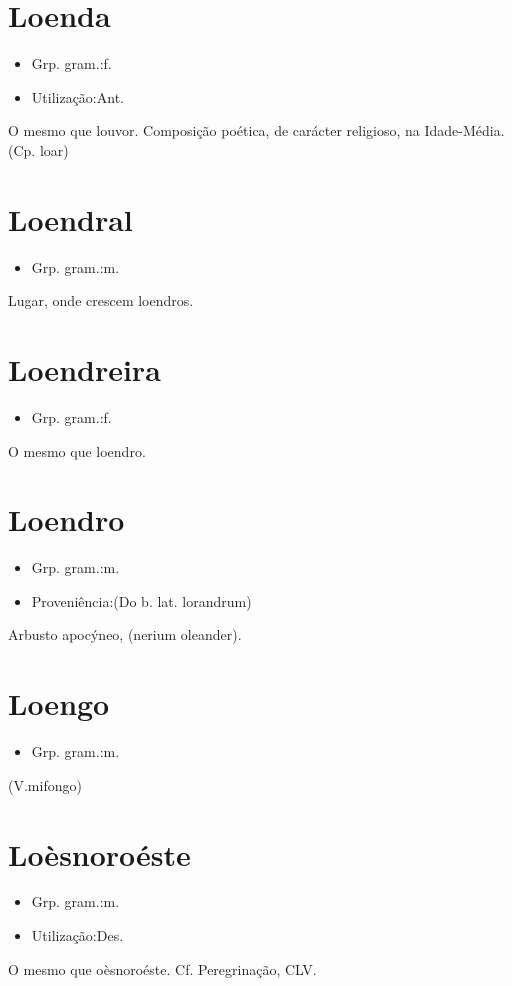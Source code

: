 \section{Loenda}
\begin{itemize}
\item {Grp. gram.:f.}
\end{itemize}
\begin{itemize}
\item {Utilização:Ant.}
\end{itemize}
O mesmo que \textunderscore louvor\textunderscore .
Composição poética, de carácter religioso, na Idade-Média.
(Cp. \textunderscore loar\textunderscore )
\section{Loendral}
\begin{itemize}
\item {Grp. gram.:m.}
\end{itemize}
Lugar, onde crescem loendros.
\section{Loendreira}
\begin{itemize}
\item {Grp. gram.:f.}
\end{itemize}
O mesmo que \textunderscore loendro\textunderscore .
\section{Loendro}
\begin{itemize}
\item {Grp. gram.:m.}
\end{itemize}
\begin{itemize}
\item {Proveniência:(Do b. lat. \textunderscore lorandrum\textunderscore )}
\end{itemize}
Arbusto apocýneo, (\textunderscore nerium oleander\textunderscore ).
\section{Loengo}
\begin{itemize}
\item {Grp. gram.:m.}
\end{itemize}
(V.mifongo)
\section{Loèsnoroéste}
\begin{itemize}
\item {Grp. gram.:m.}
\end{itemize}
\begin{itemize}
\item {Utilização:Des.}
\end{itemize}
O mesmo que \textunderscore oèsnoroéste\textunderscore . Cf. \textunderscore Peregrinação\textunderscore , CLV.
